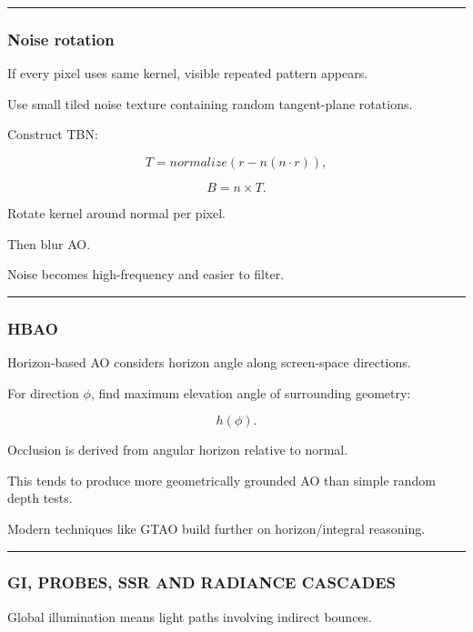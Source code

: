 \begin{center}\rule{0.5\linewidth}{0.5pt}\end{center}

\subsubsection{Noise rotation}\label{noise-rotation}

If every pixel uses same kernel, visible repeated pattern appears.

Use small tiled noise texture containing random tangent-plane rotations.

Construct TBN:

\[
T=
normalize(
r-n(n\cdot r)
),
\]

\[
B=n\times T.
\]

Rotate kernel around normal per pixel.

Then blur AO.

Noise becomes high-frequency and easier to filter.

\begin{center}\rule{0.5\linewidth}{0.5pt}\end{center}

\subsubsection{HBAO}\label{hbao}

Horizon-based AO considers horizon angle along screen-space directions.

For direction \(\phi\), find maximum elevation angle of surrounding geometry:

\[
h(\phi).
\]

Occlusion is derived from angular horizon relative to normal.

This tends to produce more geometrically grounded AO than simple random depth tests.

Modern techniques like GTAO build further on horizon/integral reasoning.

\begin{center}\rule{0.5\linewidth}{0.5pt}\end{center}

\subsubsection{GI, PROBES, SSR AND RADIANCE CASCADES}\label{gi-probes-ssr-and-radiance-cascades}

Global illumination means light paths involving indirect bounces.

